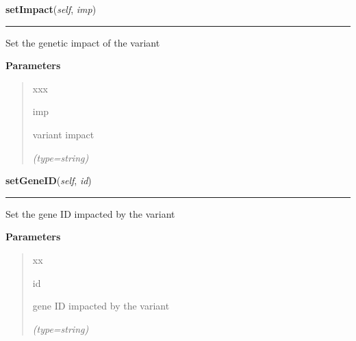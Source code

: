 \hspace{.8\funcindent}\begin{boxedminipage}{\funcwidth}

    \raggedright \textbf{setImpact}(\textit{self}, \textit{imp})

    \vspace{-1.5ex}

    \rule{\textwidth}{0.5\fboxrule}
\setlength{\parskip}{2ex}
    Set the genetic impact of the variant

\setlength{\parskip}{1ex}
      \textbf{Parameters}
      \vspace{-1ex}

      \begin{quote}
        \begin{Ventry}{xxx}

          \item[imp]

          variant impact

            {\it (type=string)}

        \end{Ventry}

      \end{quote}

    \end{boxedminipage}

    \label{script-FixedVar:var:setGeneID}

    \vspace{0.5ex}

\hspace{.8\funcindent}\begin{boxedminipage}{\funcwidth}

    \raggedright \textbf{setGeneID}(\textit{self}, \textit{id})

    \vspace{-1.5ex}

    \rule{\textwidth}{0.5\fboxrule}
\setlength{\parskip}{2ex}
    Set the gene ID impacted by the variant

\setlength{\parskip}{1ex}
      \textbf{Parameters}
      \vspace{-1ex}

      \begin{quote}
        \begin{Ventry}{xx}

          \item[id]

          gene ID impacted by the variant

            {\it (type=string)}

        \end{Ventry}

      \end{quote}

    \end{boxedminipage}

